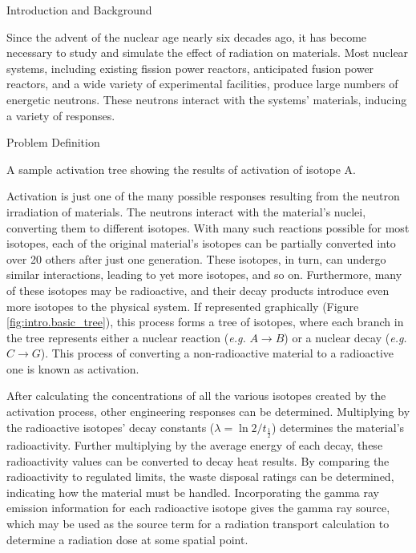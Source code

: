
\begin{chapter}{Introduction and Background}
  
  Since the advent of the nuclear age nearly six decades ago, it has
  become necessary to study and simulate the effect of radiation on
  materials.  Most nuclear systems, including existing fission power
  reactors, anticipated fusion power reactors, and a wide variety of
  experimental facilities, produce large numbers of energetic
  neutrons.  These neutrons interact with the systems' materials,
  inducing a variety of responses.

  \begin{section}{Problem Definition\label{sec:intro.prob_def}}
    
    \begin{floatingfigure}{0.55\columnwidth}
      \begin{center}
        \caption{A sample activation tree showing the results of
          activation of isotope A.}\label{fig:intro.basic_tree}
      \end{center}
    \end{floatingfigure}
    
    \noindent Activation is just one of the many possible responses resulting
    from the neutron irradiation of materials.  The neutrons interact
    with the material's nuclei, converting them to different isotopes.
    With many such reactions possible for most isotopes, each of the
    original material's isotopes can be partially converted into over
    20 others after just one generation.  These isotopes, in turn, can
    undergo similar interactions, leading to yet more isotopes, and so
    on.  Furthermore, many of these isotopes may be radioactive, and
    their decay products introduce even more isotopes to the physical
    system.  If represented graphically (Figure
    \ref{fig:intro.basic_tree}), this process forms a tree of
    isotopes, where each branch in the tree represents either a
    nuclear reaction (\textsl{e.g.} $A \rightarrow B$) or a nuclear
    decay (\textsl{e.g.} $C \rightarrow G$).  This process of
    converting a non-radioactive material to a radioactive one is
    known as activation.
    
    After calculating the concentrations of all the various isotopes
    created by the activation process, other engineering responses can
    be determined.  Multiplying by the radioactive isotopes' decay
    constants ($\lambda = \ln 2/t_{\frac{1}{2}}$) determines the
    material's radioactivity.  Further multiplying by the average
    energy of each decay, these radioactivity values can be converted
    to decay heat results.  By comparing the radioactivity to
    regulated limits, the waste disposal ratings can be determined,
    indicating how the material must be handled.  Incorporating the
    gamma ray emission information for each radioactive isotope gives
    the gamma ray source, which may be used as the source term for a
    radiation transport calculation to determine a radiation dose at
    some spatial point.
    

\end{section}
\end{chapter}
